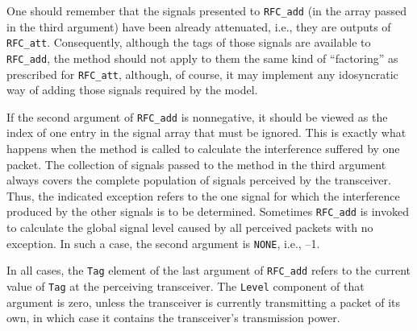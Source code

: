 One should remember that the signals presented to {\tt RFC\_add} (in
the array passed in the third argument) have been already attenuated,
i.e., they are outputs of {\tt RFC\_att}.
Consequently, although the tags of those signals
are available to {\tt RFC\_add}, the
method should not apply to them the same kind of ``factoring''
as prescribed for {\tt RFC\_att}, although, of course, it may implement any
idosyncratic way of adding those signals required by the model.

If the second argument of {\tt RFC\_add} is nonnegative, it should be viewed
as the index of one entry in the signal array that must be ignored.
This is exactly what happens when the method is called to calculate the
interference suffered by one packet.
The collection of signals passed to the method in the third argument always
covers the complete population of signals perceived by the transceiver.
Thus, the indicated exception refers to the one signal for which the
interference produced by the other signals is to be determined.
Sometimes {\tt RFC\_add} is invoked to calculate the global signal level
caused by all perceived packets with no exception.
In such a case, the second argument is {\tt NONE}, i.e., --1.

In all cases, the {\tt Tag} element of the last argument of {\tt RFC\_add}
refers to the current value of {\tt Tag} at the perceiving transceiver.
The {\tt Level} component of that argument is zero, unless the transceiver is
currently transmitting a packet of its own, in which case it contains the
transceiver's transmission power.

